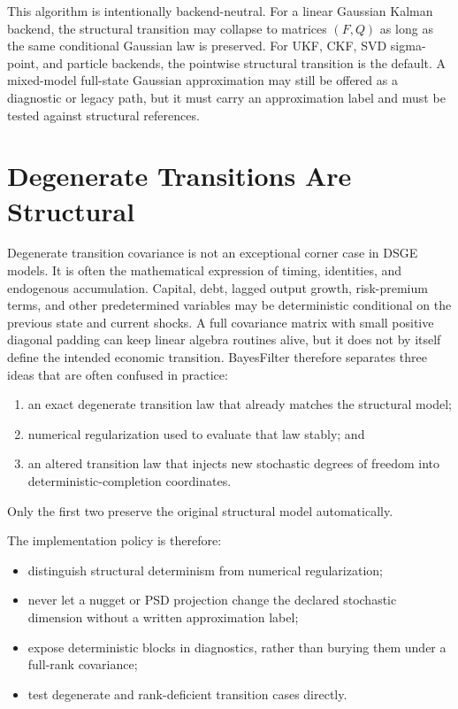 This algorithm is intentionally backend-neutral.  For a linear Gaussian Kalman
backend, the structural transition may collapse to matrices $(F,Q)$ as long as
the same conditional Gaussian law is preserved.  For UKF, CKF, SVD sigma-point,
and particle backends, the pointwise structural transition is the default.  A
mixed-model full-state Gaussian approximation may still be offered as a
diagnostic or legacy path, but it must carry an approximation label and must be
tested against structural references.

\section[Degenerate Transitions]{Degenerate Transitions Are Structural}
\label{sec:bf-degenerate-transitions-structural}

Degenerate transition covariance is not an exceptional corner case in DSGE
models.  It is often the mathematical expression of timing, identities, and
endogenous accumulation.  Capital, debt, lagged output growth, risk-premium
terms, and other predetermined variables may be deterministic conditional on
the previous state and current shocks.  A full covariance matrix with small positive diagonal padding can keep linear
algebra routines alive, but it does not by itself define the intended economic
transition.  BayesFilter therefore separates three ideas that are often
confused in practice:
\begin{enumerate}[label=(\roman*)]
  \item an exact degenerate transition law that already matches the structural
    model;
  \item numerical regularization used to evaluate that law stably; and
  \item an altered transition law that injects new stochastic degrees of
    freedom into deterministic-completion coordinates.
\end{enumerate}
Only the first two preserve the original structural model automatically.

The implementation policy is therefore:
\begin{itemize}
  \item distinguish structural determinism from numerical regularization;
  \item never let a nugget or PSD projection change the declared stochastic
    dimension without a written approximation label;
  \item expose deterministic blocks in diagnostics, rather than burying them
    under a full-rank covariance;
  \item test degenerate and rank-deficient transition cases directly.
\end{itemize}

